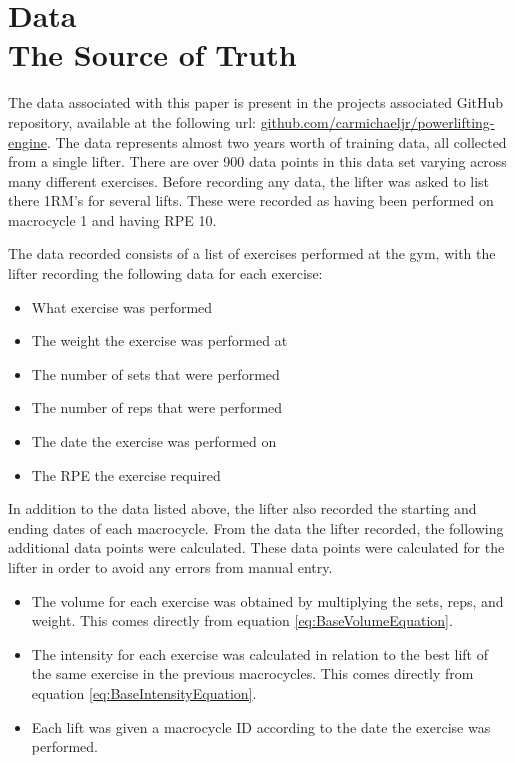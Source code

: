 \chapter{
    Data
    \\
    \large{The Source of Truth}
}
\label{sec:DataSection}

The data associated with this paper is present in the projects associated GitHub repository, available at the following url:  \url{github.com/carmichaeljr/powerlifting-engine}.
The data represents almost two years worth of training data, all collected from a single lifter. There are over 900 data points in this data set varying across many different exercises. Before recording any data, the lifter was asked to list there 1RM's for several lifts. These were recorded as having been performed on macrocycle 1 and having RPE 10.

The data recorded consists of a list of exercises performed at the gym, with the lifter recording the following data for each exercise:

\begin{itemize}
    \item What exercise was performed
    \item The weight the exercise was performed at
    \item The number of sets that were performed
    \item The number of reps that were performed
    \item The date the exercise was performed on
    \item The RPE the exercise required
\end{itemize}

In addition to the data listed above, the lifter also recorded the starting and ending dates of each macrocycle. From the data the lifter recorded, the following additional data points were calculated. These data points were calculated for the lifter in order to avoid any errors from manual entry.

\begin{itemize}
    \item The volume for each exercise was obtained by multiplying the sets, reps, and weight. This comes directly from equation \ref{eq:BaseVolumeEquation}.
    \item The intensity for each exercise was calculated in relation to the best lift of the same exercise in the previous macrocycles. This comes directly from equation \ref{eq:BaseIntensityEquation}.
    \item Each lift was given a macrocycle ID according to the date the exercise was performed.
\end{itemize}

